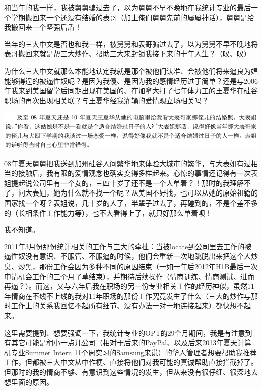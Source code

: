 \documentclass[9pt, b5paper]{article}
\begin{document}
和当年的我一样，我被舅舅骗过去了，以为舅舅不早不晚地在我统计专业的最后一个学期搬回来一个还没有结婚的表哥（加上俺们舅舅先前的屡屡神话），舅舅是给我搬回来一个坚强后盾！

当年的三大中文是否也和我一样，被舅舅和表哥骗过去了，以为舅舅不早不晚地将表哥搬回来就是帮三大炒作、帮助三大来封锁我接下来的十年人生？（叹、叹）

为什么三大中文就那么本能地认定我就是那个被他们认准、会被他们将来逼良为娼能够得逞的被逼性奴呢？是因为我傻、是因为我的感情经历过于简单？还是与2006年我来到美国留学后同期出现在美国的、在加拿大打了七年体力工的王夏华在硅谷职场的再次出现相关联？与王夏华经我灌输的爱情观立场相关吗？

\begin{center}
\includegraphics[width=.9\linewidth]{./pic/pfp53.png}
\end{center}

08年夏天舅舅把我送到加州硅谷人间繁华地来体验大城市的繁华，与大表姐有过相当的接触后，我有限的爱情观念也确实变得多样起来。心惊的事情还记得有一次表姐提起说公司里有一个女的，三四十岁了还不是一个人单着？！那时的我理解不了，问大表姐，她为什么就不找一个呢？从美国不好找，也可以从她的原始祖籍的国家找一个呀？表姐说，几十岁的人了，半辈子过去了，再碰到的，不是个差不多的（长相条件工作能力等），也不大看得上了，就只好那么单着呗！

我不知道。

2011年3月份那份统计相关的工作与三大的牵扯：当被locate到公司里去工作的被逼性奴没有意识、不服管、不服逼的时候，他们会重新一次地跳脱出来把这个人炒臭、炒黑，那份工作会因为多种不同的原因结束（一如一年后2012年H1B最后一次申请机会工作的三个月了草结束），并期待后续操作（情商训练、情商测试、进而再逼？）。而这，又与六年后我在职场的另一份专业相关工作的经历神似，虽然11年情商在不线不上线的我对11年职场的那份工作究竟发生了什么（三大的炒作与那时工作上的关系我回忆不起所有细节、没有办法一对一地连接起来）都快想不起来。 

这里需要提到、想要强调一下，我统计专业的OPT的29个月期间，我是有注意到有其它可能是稍小一点儿公司（相对于后来的PayPal、以及后来2013年夏天计算机专业Summer Intern 11个周实习的Samsung来说）的华人管理者想要帮助我推荐工作，但都被三大中文从中作梗、直接将他们对我可能的真诚帮助直接拦截掉了。但那时的我的情商不够、有意识到这些情况的发生，但从来没有很仔细、很深地去想里面的原因。 
\end{document}
